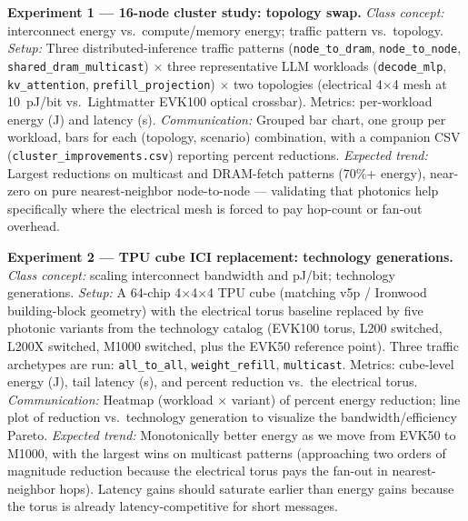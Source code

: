 \documentclass[conference,onecolumn]{IEEEtran}
\begin{document}
\textbf{Experiment 1 --- 16-node cluster study: topology swap.}
\emph{Class concept:} interconnect energy vs.\ compute/memory energy; traffic
pattern vs.\ topology.
\emph{Setup:} Three distributed-inference traffic patterns
(\texttt{node\_to\_dram}, \texttt{node\_to\_node},
\texttt{shared\_dram\_multicast}) $\times$ three representative LLM workloads
(\texttt{decode\_mlp}, \texttt{kv\_attention}, \texttt{prefill\_projection})
$\times$ two topologies (electrical 4$\times$4 mesh at 10~pJ/bit vs.\ Lightmatter
EVK100 optical crossbar). Metrics: per-workload energy (J) and latency (s).
\emph{Communication:} Grouped bar chart, one group per workload, bars for each
(topology, scenario) combination, with a companion CSV
(\texttt{cluster\_improvements.csv}) reporting percent reductions.
\emph{Expected trend:} Largest reductions on multicast and DRAM-fetch patterns
(70\%+ energy), near-zero on pure nearest-neighbor node-to-node --- validating
that photonics help specifically where the electrical mesh is forced to pay
hop-count or fan-out overhead.

\textbf{Experiment 2 --- TPU cube ICI replacement: technology generations.}
\emph{Class concept:} scaling interconnect bandwidth and pJ/bit; technology
generations.
\emph{Setup:} A 64-chip 4$\times$4$\times$4 TPU cube (matching v5p / Ironwood
building-block geometry) with the electrical torus baseline replaced by five
photonic variants from the technology catalog (EVK100 torus, L200 switched,
L200X switched, M1000 switched, plus the EVK50 reference point). Three traffic
archetypes are run: \texttt{all\_to\_all}, \texttt{weight\_refill},
\texttt{multicast}. Metrics: cube-level energy (J), tail latency (s), and
percent reduction vs.\ the electrical torus.
\emph{Communication:} Heatmap (workload $\times$ variant) of percent energy
reduction; line plot of reduction vs.\ technology generation to visualize the
bandwidth/efficiency Pareto.
\emph{Expected trend:} Monotonically better energy as we move from EVK50 to
M1000, with the largest wins on multicast patterns (approaching two orders of
magnitude reduction because the electrical torus pays the fan-out in
nearest-neighbor hops). Latency gains should saturate earlier than energy
gains because the torus is already latency-competitive for short messages.
\end{document}
